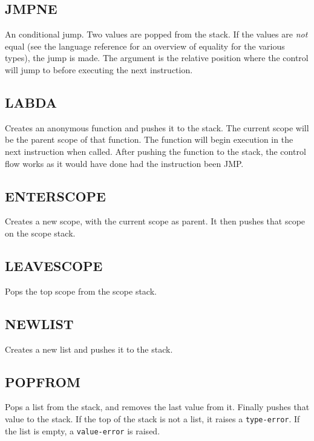 \subsection{JMPNE}
\label{sec:jmpne}

An conditional jump. Two values are popped from the stack. If the values
are \emph{not} equal (see the language reference for an overview of
equality for the various types), the jump is made. The argument is the
relative position where the control will jump to before executing the
next instruction.

\subsection{LABDA}
\label{sec:labda}

Creates an anonymous function and pushes it to the stack. The current
scope will be the parent scope of that function. The function will begin
execution in the next instruction when called. After pushing the
function to the stack, the control flow works as it would have done had
the instruction been JMP.

\subsection{ENTER\textunderscore{}SCOPE}
\label{sec:enterscope}

Creates a new scope, with the current scope as parent. It then pushes
that scope on the scope stack.

\subsection{LEAVE\textunderscore{}SCOPE}
\label{sec:leavescope}

Pops the top scope from the scope stack.

\subsection{NEW\textunderscore{}LIST}
\label{sec:newlist}

Creates a new list and pushes it to the stack.

\subsection{POP\textunderscore{}FROM}
\label{sec:popfrom}

Pops a list from the stack, and removes the last value from it. Finally
pushes that value to the stack. If the top of the stack is not a list,
it raises a \verb!type-error!. If the list is empty, a
\verb!value-error! is raised.

